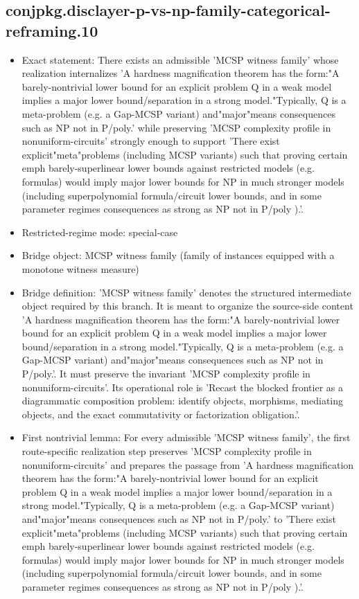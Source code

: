 \documentclass[11pt]{article}
\begin{document}
\subsection*{conjpkg.disclayer-p-vs-np-family-categorical-reframing.10}
\begin{itemize}
\item Exact statement: There exists an admissible 'MCSP witness family' whose realization internalizes 'A hardness magnification theorem has the form:"A barely-nontrivial lower bound for an explicit problem Q in a weak model implies a major lower bound/separation in a strong model."Typically, Q is a meta-problem (e.g. a Gap-MCSP variant) and"major"means consequences such as NP not in P/poly.' while preserving 'MCSP complexity profile in nonuniform-circuits' strongly enough to support 'There exist explicit"meta"problems (including MCSP variants) such that proving certain emph barely-superlinear lower bounds against restricted models (e.g. formulas) would imply major lower bounds for NP in much stronger models (including superpolynomial formula/circuit lower bounds, and in some parameter regimes consequences as strong as NP not in P/poly ).'.
\item Restricted-regime mode: special-case
\item Bridge object: MCSP witness family (family of instances equipped with a monotone witness measure)
\item Bridge definition: 'MCSP witness family' denotes the structured intermediate object required by this branch. It is meant to organize the source-side content 'A hardness magnification theorem has the form:"A barely-nontrivial lower bound for an explicit problem Q in a weak model implies a major lower bound/separation in a strong model."Typically, Q is a meta-problem (e.g. a Gap-MCSP variant) and"major"means consequences such as NP not in P/poly.'. It must preserve the invariant 'MCSP complexity profile in nonuniform-circuits'. Its operational role is 'Recast the blocked frontier as a diagrammatic composition problem: identify objects, morphisms, mediating objects, and the exact commutativity or factorization obligation.'.
\item First nontrivial lemma: For every admissible 'MCSP witness family', the first route-specific realization step preserves 'MCSP complexity profile in nonuniform-circuits' and prepares the passage from 'A hardness magnification theorem has the form:"A barely-nontrivial lower bound for an explicit problem Q in a weak model implies a major lower bound/separation in a strong model."Typically, Q is a meta-problem (e.g. a Gap-MCSP variant) and"major"means consequences such as NP not in P/poly.' to 'There exist explicit"meta"problems (including MCSP variants) such that proving certain emph barely-superlinear lower bounds against restricted models (e.g. formulas) would imply major lower bounds for NP in much stronger models (including superpolynomial formula/circuit lower bounds, and in some parameter regimes consequences as strong as NP not in P/poly ).'.

\end{itemize}
\end{document}
